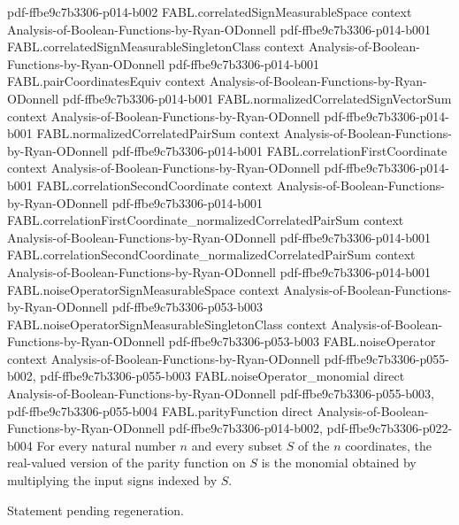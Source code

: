 \begin{theorem}
{    pdf-ffbe9c7b3306-p014-b002}
\proofstep
  {FABL.correlatedSignMeasurableSpace}
  {context}
  {Analysis-of-Boolean-Functions-by-Ryan-ODonnell}
  {pdf-ffbe9c7b3306-p014-b001}
\proofstep
  {FABL.correlatedSignMeasurableSingletonClass}
  {context}
  {Analysis-of-Boolean-Functions-by-Ryan-ODonnell}
  {pdf-ffbe9c7b3306-p014-b001}
\proofstep
  {FABL.pairCoordinatesEquiv}
  {context}
  {Analysis-of-Boolean-Functions-by-Ryan-ODonnell}
  {pdf-ffbe9c7b3306-p014-b001}
\proofstep
  {FABL.normalizedCorrelatedSignVectorSum}
  {context}
  {Analysis-of-Boolean-Functions-by-Ryan-ODonnell}
  {pdf-ffbe9c7b3306-p014-b001}
\proofstep
  {FABL.normalizedCorrelatedPairSum}
  {context}
  {Analysis-of-Boolean-Functions-by-Ryan-ODonnell}
  {pdf-ffbe9c7b3306-p014-b001}
\proofstep
  {FABL.correlationFirstCoordinate}
  {context}
  {Analysis-of-Boolean-Functions-by-Ryan-ODonnell}
  {pdf-ffbe9c7b3306-p014-b001}
\proofstep
  {FABL.correlationSecondCoordinate}
  {context}
  {Analysis-of-Boolean-Functions-by-Ryan-ODonnell}
  {pdf-ffbe9c7b3306-p014-b001}
\proofstep
  {FABL.correlationFirstCoordinate_normalizedCorrelatedPairSum}
  {context}
  {Analysis-of-Boolean-Functions-by-Ryan-ODonnell}
  {pdf-ffbe9c7b3306-p014-b001}
\proofstep
  {FABL.correlationSecondCoordinate_normalizedCorrelatedPairSum}
  {context}
  {Analysis-of-Boolean-Functions-by-Ryan-ODonnell}
  {pdf-ffbe9c7b3306-p014-b001}
\proofstep
  {FABL.noiseOperatorSignMeasurableSpace}
  {context}
  {Analysis-of-Boolean-Functions-by-Ryan-ODonnell}
  {pdf-ffbe9c7b3306-p053-b003}
\proofstep
  {FABL.noiseOperatorSignMeasurableSingletonClass}
  {context}
  {Analysis-of-Boolean-Functions-by-Ryan-ODonnell}
  {pdf-ffbe9c7b3306-p053-b003}
\proofstep
  {FABL.noiseOperator}
  {context}
  {Analysis-of-Boolean-Functions-by-Ryan-ODonnell}
  {pdf-ffbe9c7b3306-p055-b002,
    pdf-ffbe9c7b3306-p055-b003}
\proofstep
  {FABL.noiseOperator_monomial}
  {direct}
  {Analysis-of-Boolean-Functions-by-Ryan-ODonnell}
  {pdf-ffbe9c7b3306-p055-b003,
    pdf-ffbe9c7b3306-p055-b004}
\proofstep
  {FABL.parityFunction}
  {direct}
  {Analysis-of-Boolean-Functions-by-Ryan-ODonnell}
  {pdf-ffbe9c7b3306-p014-b002,
    pdf-ffbe9c7b3306-p022-b004}
For every natural number $n$ and every subset $S$ of the $n$ coordinates, the
real-valued version of the parity function on $S$ is the monomial obtained by
multiplying the input signs indexed by $S$.
\end{theorem}

\begin{theorem}
\label{FABL.noiseStability_parityFunction}
\leanok
{}
Statement pending regeneration.
\end{theorem}

